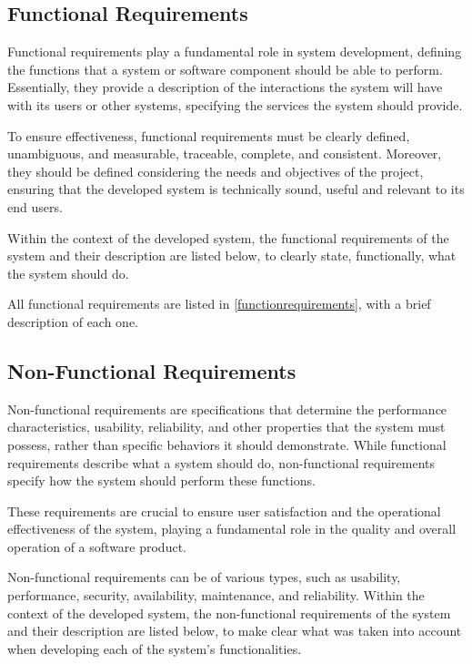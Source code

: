 \subsection[Functional Requirements]{Functional Requirements}
Functional requirements play a fundamental role in system development, defining the functions that a system or software component should be able to perform. Essentially, they provide a description of the interactions the system will have with its users or other systems, specifying the services the system should provide.

To ensure effectiveness, functional requirements must be clearly defined, unambiguous, and measurable, traceable, complete, and consistent. Moreover, they should be defined considering the needs and objectives of the project, ensuring that the developed system is technically sound, useful and relevant to its end users.

Within the context of the developed system, the functional requirements of the system and their description are listed below, to clearly state, functionally, what the system should do.

All functional requirements are listed in \ref{functionrequirements}, with a brief description of each one.

\subsection[Non-Functional Requirements]{Non-Functional Requirements}\label{ssubec:reqNfuctional}
Non-functional requirements are specifications that determine the performance characteristics, usability, reliability, and other properties that the system must possess, rather than specific behaviors it should demonstrate. While functional requirements describe what a system should do, non-functional requirements specify how the system should perform these functions.

These requirements are crucial to ensure user satisfaction and the operational effectiveness of the system, playing a fundamental role in the quality and overall operation of a software product.

Non-functional requirements can be of various types, such as usability, performance, security, availability, maintenance, and reliability. Within the context of the developed system, the non-functional requirements of the system and their description are listed below, to make clear what was taken into account when developing each of the system's functionalities.

